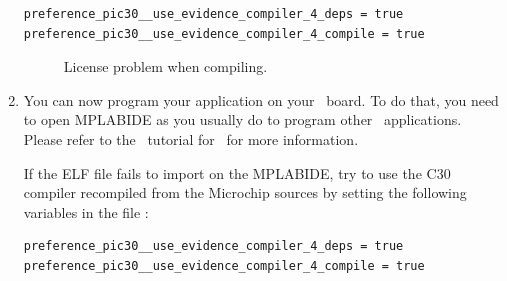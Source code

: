 \begin{enumerate}
\begin{warning}
\begin{lstlisting}
preference_pic30__use_evidence_compiler_4_deps = true
preference_pic30__use_evidence_compiler_4_compile = true
\end{lstlisting}
\end{warning}
%
\begin{figure}[htb]
\caption{License problem when compiling.}
\label{fig:license_problem}
\end{figure}

\item
  You can now program your application on your \flex\ board. To do
  that, you need to open MPLABIDE as you usually do to program other
  \ee\ applications. Please refer to the \ee\ tutorial for \dspic\
  for more information.
  
  \begin{warning}
    If the ELF file fails to import on the MPLABIDE, try to use the
    C30 compiler recompiled from the Microchip sources by setting the
    following variables in the file
    :
    \begin{lstlisting}
preference_pic30__use_evidence_compiler_4_deps = true
preference_pic30__use_evidence_compiler_4_compile = true
    \end{lstlisting}
  \end{warning}


\end{enumerate}
